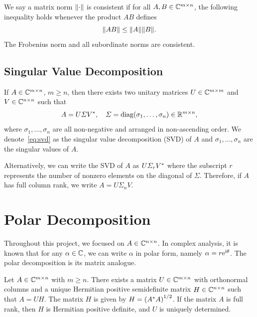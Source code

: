 \documentclass[12pt]{article}
\begin{document}
We say a matrix norm $\|{\cdot}\|$ is consistent if for all $A,B\in\mathbb{C}^{m\times n}$, the following inequality holds whenever the product $AB$ defines 
\begin{equation}
    \notag 
    \|{AB}\| \leq \|{A}\|\|{B}\|.
\end{equation}
The Frobenius norm and all subordinate norms are consistent.

\subsection{Singular Value Decomposition}\label{subsec:svd}
\begin{theorem}
    \label{thm:svd}
    If $A\in\mathbb{C}^{m\times n}$, $m\geq n$, then there exists two unitary matrices $U\in\mathbb{C}^{m\times m}$ and $V\in\mathbb{C}^{n\times n}$ such that 
    \begin{equation}\label{eq:svd}
        A = U\varSigma V^*,\quad \varSigma = \mathrm{diag}(\sigma_1,\dots,\sigma_n)\in\mathbb{R}^{m\times n},
    \end{equation}
    where $\sigma_1,\dots,\sigma_n$ are all non-negative and arranged in non-ascending order. We denote~\eqref{eq:svd} as the singular value decomposition (SVD) of $A$ and $\sigma_1,\dots,\sigma_n$ are the singular values of $A$.
\end{theorem}

Alternatively, we can write the SVD of $A$ as $U\varSigma_rV^*$ where the subscript $r$ represents the number of nonzero elements on the diagonal of $\Sigma$. Therefore, if $A$ has full column rank, we write $A = U\Sigma_n V$. 




\section{Polar Decomposition}\label{sec:polar-properties}

Throughout this project, we focused on $A\in\mathbb{C}^{n\times n}$. In complex analysis, it is known that for any $\alpha\in\mathbb{C}$, we can write $\alpha$ in polar form, namely $\alpha = r\mathrm{e}^{\mathrm{i} \theta}$. The polar decomposition is its matrix analogue.

\begin{theorem}
     \label{def:pol-dec-definition}
    Let $A\in\mathbb{C}^{m\times n}$ with $m \geq n$. There exists a matrix $U\in\mathbb{C}^{m\times n}$ with orthonormal columns and a unique Hermitian positive semidefinite matrix $H\in\mathbb{C}^{n\times n}$ such that $A = UH$. The matrix $H$ is given by $H = \left(A^* A\right)^{1/2}$. If the matrix $A$ is full rank, then $H$ is Hermitian positive definite, and $U$ is uniquely determined.
\end{theorem}
\end{document}

